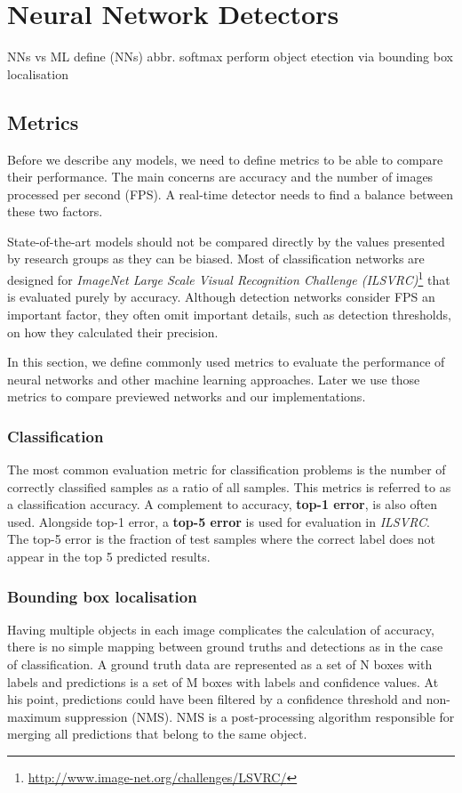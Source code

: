 \chapter{Neural Network Detectors}
NNs vs ML
define (NNs) abbr.
softmax
perform object etection via bounding box localisation

\section{Metrics}
Before we describe any models, we need to define metrics to be able to compare their performance. The main concerns are accuracy and the number of images processed per second (FPS). A real-time detector needs to find a balance between these two factors.

State-of-the-art models should not be compared directly by the values presented by research groups as they can be biased. Most of classification networks are designed for \textit{ImageNet Large Scale Visual Recognition Challenge (ILSVRC)}\footnote{\url{http://www.image-net.org/challenges/LSVRC/}} that is evaluated purely by accuracy. Although detection networks consider FPS an important factor, they often omit important details, such as detection thresholds, on how they calculated their precision.

In this section, we define commonly used metrics to evaluate the performance of neural networks and other machine learning approaches. Later we use those metrics to compare previewed networks and our implementations.

\subsection*{Classification}
The most common evaluation metric for classification problems is the number of correctly classified samples as a ratio of all samples. This metrics is referred to as a classification accuracy. A complement to accuracy, \textbf{top-1 error}, is also often used. Alongside top-1 error, a \textbf{top-5 error} is used for evaluation in \textit{ILSVRC}. The top-5 error is the fraction of test samples where the correct label does not appear in the top 5 predicted results.

\subsection*{Bounding box localisation}
Having multiple objects in each image complicates the calculation of accuracy, there is no simple mapping between ground truths and detections as in the case of classification. A ground truth data are represented as a set of N boxes with labels and predictions is a set of M boxes with labels and confidence values. At his point, predictions could have been filtered by a confidence threshold and non-maximum suppression (NMS). NMS is a post-processing algorithm responsible for merging all predictions that belong to the same object. 

